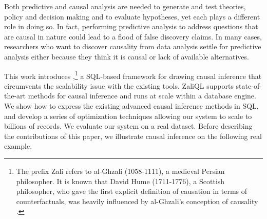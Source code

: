 Both predictive and causal analysis are needed to generate
and test theories,  policy and decision making and to evaluate hypotheses, yet each plays a different role in doing so. In fact, performing predictive analysis to address questions that are causal in nature could lead to a flood of false discovery claims. In many cases, researchers who want to discover causality from data analysis settle for predictive analysis either because they think it is causal or lack of available alternatives.

This work introduces \GSQL,\footnote{ The prefix Zali refers to
  al-Ghzali (1058-1111), a medieval Persian philosopher. It is known
  that David Hume (1711-1776), a Scottish philosopher, who gave the
  first explicit definition of causation in terms of counterfactuals,
  was heavily influenced by al-Ghzali's conception of causality
  \cite{shalizi2013advanced}.}  a SQL-based framework for drawing
causal inference that circumvents the scalability issue with the
existing tools.  ZaliQL supports state-of-the-art methods for causal
inference and runs at scale within a database engine.  We show how to
express the existing advanced causal inference methods in SQL, and
develop a series of optimization techniques allowing our system to
scale to billions of records. We evaluate our system on a real
dataset.  Before describing the contributions of this paper, we
illustrate causal inference on the following real example.

